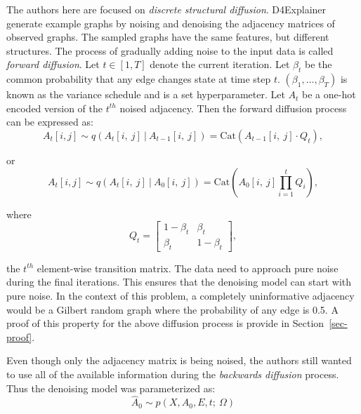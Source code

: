 \documentclass[
  11pt,
  letterpaper,
]{article}
\begin{document}
\quad The authors here are focused on \emph{discrete structural
diffusion}. D4Explainer generate example graphs by noising and denoising
the adjacency matrices of observed graphs. The sampled graphs have the
same features, but different structures. The process of gradually adding
noise to the input data is called \emph{forward diffusion}. Let
\(t \in [1, T]\) denote the current iteration. Let \(\beta_t\) be the
common probability that any edge changes state at time step \(t\).
\((\beta_1, \dots, \beta_T)\) is known as the variance schedule and is a
set hyperparameter. Let \(A_t\) be a one-hot encoded version of the
\(t^{th}\) noised adjacency. Then the forward diffusion process can be
expressed as:\\
\begin{equation}
        A_t[i, j] \sim q(A_t[i, \ j] \ | \ A_{t-1}[i, \ j]) 
        = \text{Cat}(A_{t-1}[i, \ j] \cdot Q_t), 
\end{equation}

or \begin{equation} \label{eq-forward-diff}
        A_t[i, j] \sim q(A_t[i, \ j] \ | \ A_{0}[i, \ j]) 
        = \text{Cat}\left(A_0[i, \ j] \prod_{i=1}^t  Q_i \right), 
\end{equation}

where \[
Q_t = 
\left[
\begin{matrix}
    1-\beta_t & \beta_t \\ 
    \beta_t & 1 - \beta_t
\end{matrix}
\right], 
\]

the \(t^{th}\) element-wise transition matrix. The data need to approach
pure noise during the final iterations. This ensures that the denoising
model can start with pure noise. In the context of this problem, a
completely uninformative adjacency would be a Gilbert random graph where
the probability of any edge is 0.5. A proof of this property for the
above diffusion process is provide in Section~\ref{sec-proof}.

\quad Even though only the adjacency matrix is being noised, the authors
still wanted to use all of the available information during the
\emph{backwards diffusion} process. Thus the denoising model was
parameterized as: \begin{equation}
    \hat A_0 \sim p(X, A_0, E, t; \ \Omega)
\end{equation}
\end{document}
